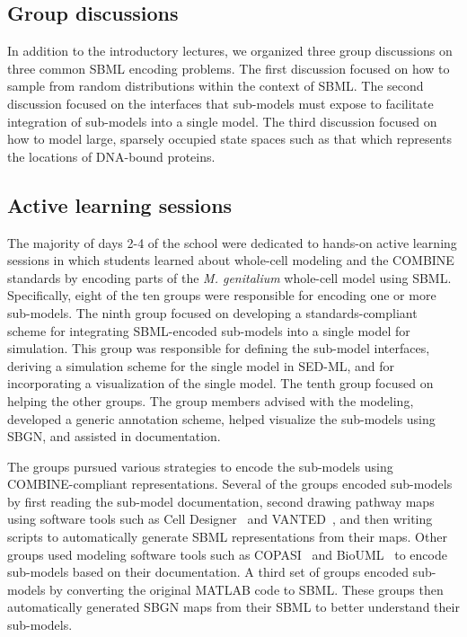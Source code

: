\documentclass[journal,transmag]{IEEEtran}
\begin{document}
\subsection{Group discussions}
In addition to the introductory lectures, we organized three group discussions on three common SBML encoding problems. The first discussion focused on how to sample from random distributions within the context of SBML. The second discussion focused on the interfaces that sub-models must expose to facilitate integration of sub-models into a single model. The third discussion focused on how to model large, sparsely occupied state spaces such as that which represents the locations of DNA-bound proteins.

\subsection{Active learning sessions}
The majority of days 2-4 of the school were dedicated to hands-on active learning sessions in which students learned about whole-cell modeling and the COMBINE standards by encoding parts of the \textit{M. genitalium} whole-cell model using SBML. Specifically, eight of the ten groups were responsible for encoding one or more sub-models. The ninth group focused on developing a standards-compliant scheme for integrating SBML-encoded sub-models into a single model for simulation. This group was responsible for defining the sub-model interfaces, deriving a simulation scheme for the single model in SED-ML, and for incorporating a visualization of the single model. The tenth group focused on helping the other groups.
The group members advised with the modeling, developed a generic annotation scheme, helped visualize the sub-models using SBGN, and assisted in documentation.

The groups pursued various strategies to encode the sub-models using COMBINE-compliant representations. Several of the groups encoded sub-models by first reading the sub-model documentation, second drawing pathway maps using software tools such as Cell Designer~\cite{funahashi2008celldesigner} and VANTED~\cite{Rohn2012}, and then writing scripts to automatically generate SBML representations from their maps. Other groups used modeling software tools such as COPASI~\cite{Mendes2009} and BioUML~\cite{Kolpakov2006} to encode sub-models based on their documentation. A third set of groups encoded sub-models by converting the original MATLAB code to SBML. These groups then automatically generated SBGN maps from their SBML to better understand their sub-models.
\end{document}
